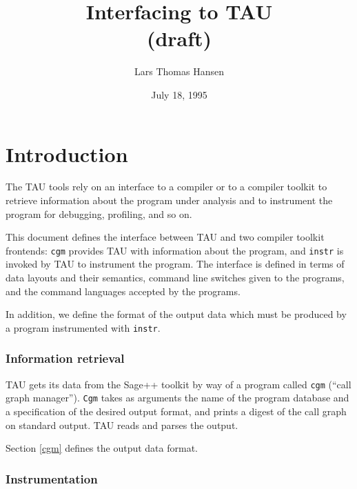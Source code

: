 
\oddsidemargin 0in
\evensidemargin 0in
\textwidth 6.5in
\topmargin -0.5in
\textheight 9in

\title{Interfacing to TAU \\ {\large(draft)}}
\author{Lars Thomas Hansen}
\date{July 18, 1995}

\newcommand{\code}[1]{{\tt #1}}

\maketitle

\section{Introduction}

The TAU tools rely on an interface to a compiler or to a compiler
toolkit to retrieve information about the program under analysis and to
instrument the program for debugging, profiling, and so on.

This document defines the interface between TAU and two compiler toolkit
frontends: \code{cgm} provides TAU with information about the program, and
\code{instr} is invoked by TAU to instrument the program. The interface
is defined in terms of data layouts and their semantics, command line
switches given to the programs, and the command languages accepted by
the programs.

In addition, we define the format of the output data which must be
produced by a program instrumented with \code{instr}.

\subsubsection*{Information retrieval}

TAU gets its data from the Sage++ toolkit by way of a program called
\code{cgm} (``call graph manager''). \code{Cgm} takes as arguments the
name of the program database and a specification of the desired output
format, and prints a digest of the call graph on standard output. TAU
reads and parses the output.

Section \ref{cgm} defines the output data format.

\subsubsection*{Instrumentation}

